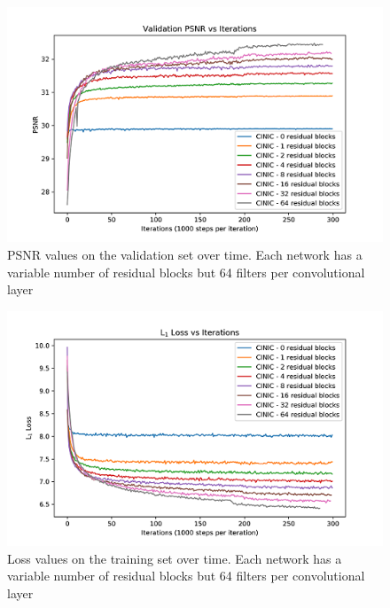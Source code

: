 \documentclass[conference]{IEEEtran}
\begin{document}
\begin{figure}[htbp]
  \centerline{\includegraphics{res-psnr.png}}
  \caption{PSNR values on the validation set over time. Each network has a variable number of residual blocks but 64 filters per convolutional layer}
  \label{fig:res-psnr}
\end{figure}

\begin{figure}[htbp]
  \centerline{\includegraphics{res-loss.png}}
  \caption{Loss values on the training set over time. Each network has a variable number of residual blocks but 64 filters per convolutional layer}
  \label{fig:res-loss}
\end{figure}
\end{document}
